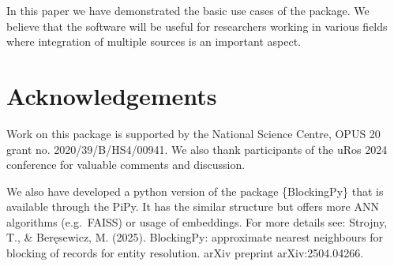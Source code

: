 In this paper we have demonstrated the basic use cases of the
 package. We believe that the software will be useful
for researchers working in various fields where integration of multiple
sources is an important aspect.

\section{Acknowledgements}\label{acknowledgements}

Work on this package is supported by the National Science Centre, OPUS
20 grant no. 2020/39/B/HS4/00941. We also thank participants of the uRos
2024 conference for valuable comments and discussion.

We also have developed a python version of the package \{BlockingPy\} that
is available through the PiPy. It has the similar structure but offers
more ANN algorithms (e.g.~FAISS) or usage of embeddings. For more
details see: Strojny, T., \& Beręsewicz, M. (2025). BlockingPy:
approximate nearest neighbours for blocking of records for entity
resolution. arXiv preprint arXiv:2504.04266.



\address{%
Maciej Beręsewicz\\
University of Economics and BusinessStatisical Office in Poznań\\%
Department of Statistics, Poznań, Poland\\ Centre for the Methodology of Population Studies\\
%
\url{https://maciejberesewicz.com}\\%
\textit{ORCiD: \href{https://orcid.org/0000-0002-8281-4301}{0000-0002-8281-4301}}\\%
\href{mailto:maciej.beresewicz@poznan.pl}{\nolinkurl{maciej.beresewicz@poznan.pl}}%
}

\address{%
Adam Struzik\\
Adam Mickiewicz UniversityStatisical Office in Poznań\\%
Department of Mathematics, Poznań, Poland\\ Centre for Urban Statistics\\
%
%
%
\href{mailto:adastr5@st.amu.edu.pl}{\nolinkurl{adastr5@st.amu.edu.pl}}%
}
